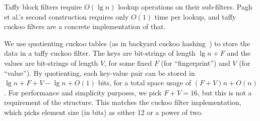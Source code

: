 \documentclass[sigconf, nonacm]{acmart}
\begin{document}

Taffy block filters require $O(\lg n)$ lookup operations on their sub-filters.
Pagh et al.'s second construction requires only $O(1)$ time per lookup, and taffy cuckoo filters are a concrete implementation of that.

We use quotienting cuckoo tables (as in backyard cuckoo hashing~\cite{backyard}) to store the data in a taffy cuckoo filter.
The keys are bit-strings of length $\lg n + F$ and the values are bit-strings of length $V$, for some fixed $F$ (for ``fingerprint'') and $V$ (for ``value'').
By quotienting, each key-value pair can be stored in $\lg n + F + V - \lg n + O(1)$ bits, for a total space usage of $(F+V)n + O(n)$.
For performance and simplicity purposes, we pick $F + V = 16$, but this is not a requirement of the structure.
This matches the cuckoo filter implementation, which picks element size (in bits) as either 12 or a power of two.

\end{document}
